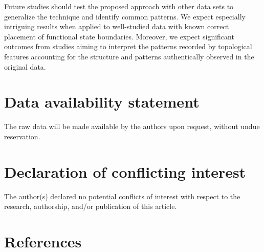 \documentclass[10pt]{iopart}
\begin{document}
Future studies should test the proposed approach with other data sets to generalize the technique and identify common patterns. We expect especially intriguing results when applied to well-studied data with known correct placement of functional state boundaries. Moreover, we expect significant outcomes from studies aiming to interpret the patterns recorded by topological features accounting for the structure and patterns authentically observed in the original data.

\section*{Data availability statement}

The raw data will be made available by the authors upon request, without undue reservation.

\section*{Declaration of conflicting interest}

The author(s) declared no potential conflicts of interest with respect to the research, authorship, and/or publication of this article.

\section*{References}

{}

\end{document}
